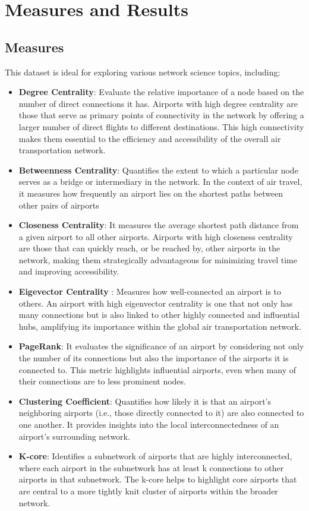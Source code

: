 \documentclass[12pt]{article}
\begin{document}
\section{Measures and Results}
\subsection{Measures}
This dataset is ideal for exploring various network science topics, including:
\begin{itemize}
    \item \textbf{Degree Centrality}: Evaluate the relative importance of a node based on the number of direct connections it has. Airports with high degree centrality are those that serve as primary points of connectivity in the network by offering a larger number of direct flights to different destinations. This high connectivity makes them essential to the efficiency and accessibility of the overall air transportation network.
    \item \textbf{Betweenness Centrality}: Quantifies the extent to which a particular node serves as a bridge or intermediary in the network. In the context of air travel, it measures how frequently an airport lies on the shortest paths between other pairs of airports
    \item \textbf{Closeness Centrality}: It measures the average shortest path distance from a given airport to all other airports. Airports with high closeness centrality are those that can quickly reach, or be reached by, other airports in the network, making them strategically advantageous for minimizing travel time and improving accessibility.
    \item \textbf{Eigevector Centrality }: Measures how well-connected an airport is to others. An airport with high eigenvector centrality is one that not only has many connections but is also linked to other highly connected and influential hubs, amplifying its importance within the global air transportation network.
    \item \textbf{PageRank}: It evaluates the significance of an airport by considering not only the number of its connections but also the importance of the airports it is connected to. This metric highlights influential airports, even when many of their connections are to less prominent nodes.
    \item \textbf{Clustering Coefficient}: Quantifies how likely it is that an airport’s neighboring airports (i.e., those directly connected to it) are also connected to one another. It provides insights into the local interconnectedness of an airport's surrounding network.
    \item \textbf{K-core}: Identifies a subnetwork of airports that are highly interconnected, where each airport in the subnetwork has at least k connections to other airports in that subnetwork. The k-core helps to highlight core airports that are central to a more tightly knit cluster of airports within the broader network.
    \end{itemize}
\newpage
\end{document}
